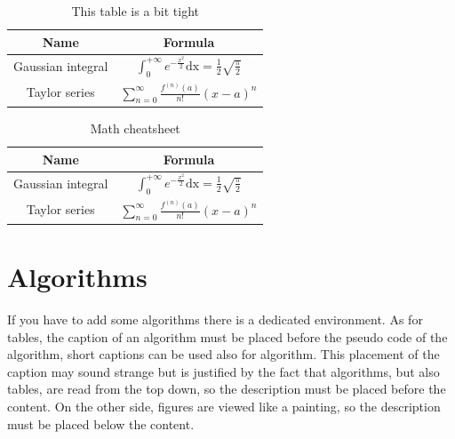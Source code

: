 \begin{table}[h]
\caption{\label{tab:math-table}This table is a bit tight}

\centering{}%
\begin{tabular}{cc}
\toprule 
\textbf{Name} & \textbf{Formula}\tabularnewline
\midrule 
Gaussian integral & $\int_{0}^{+\infty}e^{-\frac{x^{2}}{2}}\text{dx}=\frac{1}{2}\sqrt{\frac{\pi}{2}}$\tabularnewline
Taylor series & $\sum_{n=0}^{\infty}\frac{f^{\left(n\right)}\left(a\right)}{n!}\left(x-a\right)^{n}$\tabularnewline
\bottomrule
\end{tabular}
\end{table}
\begin{table}[h]
\caption{\label{tab:math-table-big-rows}Math cheatsheet}

\centering{}\renewcommand*{\arraystretch}{1.5}%
\begin{tabular}{cc}
\toprule 
\textbf{Name} & \textbf{Formula}\tabularnewline
\midrule 
Gaussian integral & $ $$\int_{0}^{+\infty}e^{-\frac{x^{2}}{2}}\text{dx}=\frac{1}{2}\sqrt{\frac{\pi}{2}}$\tabularnewline
Taylor series & $\sum_{n=0}^{\infty}\frac{f^{\left(n\right)}\left(a\right)}{n!}\left(x-a\right)^{n}$\tabularnewline
\bottomrule
\end{tabular}
\end{table}

\section{Algorithms}

If you have to add some algorithms there is a dedicated \LyX{} environment.
As for tables, the caption of an algorithm must be placed before the
pseudo code of the algorithm, short captions can be used also for
algorithm. This placement of the caption may sound strange but is
justified by the fact that algorithms, but also tables, are read from
the top down, so the description must be placed before the content.
On the other side, figures are viewed like a painting, so the description
must be placed below the content.

